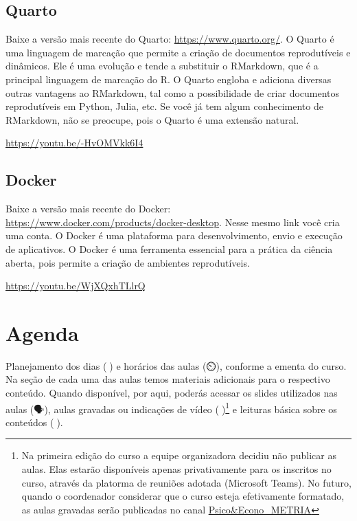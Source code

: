 \documentclass[
  a4paper,
]{article}
\begin{document}
\subsection*{Quarto}\label{sec-quartoprework}


Baixe a versão mais recente do Quarto: \url{https://www.quarto.org/}. O
Quarto é uma linguagem de marcação que permite a criação de documentos
reprodutíveis e dinâmicos. Ele é uma evolução e tende a substituir o
RMarkdown, que é a principal linguagem de marcação do R. O Quarto
engloba e adiciona diversas outras vantagens ao RMarkdown, tal como a
possibilidade de criar documentos reprodutíveis em Python, Julia, etc.
Se você já tem algum conhecimento de RMarkdown, não se preocupe, pois o
Quarto é uma extensão natural.

\url{https://youtu.be/-HvOMVkk6I4}

\subsection*{Docker}\label{sec-dockerprework}


Baixe a versão mais recente do Docker:
\url{https://www.docker.com/products/docker-desktop}. Nesse mesmo link
você cria uma conta. O Docker é uma plataforma para desenvolvimento,
envio e execução de aplicativos. O Docker é uma ferramenta essencial
para a prática da ciência aberta, pois permite a criação de ambientes
reprodutíveis.

\url{https://youtu.be/WjXQxhTLlrQ}


\section*{Agenda 📅}\label{sec-schedule}


Planejamento dos dias (📅) e horários das aulas (⏲️), conforme a ementa
do curso. Na seção de cada uma das aulas temos materiais adicionais para
o respectivo conteúdo. Quando disponível, por aqui, poderás acessar os
slides utilizados nas aulas (🗣️), aulas gravadas ou indicações de vídeo
(🎥)\footnote{Na primeira edição do curso a equipe organizadora decidiu
  não publicar as aulas. Elas estarão disponíveis apenas privativamente
  para os inscritos no curso, através da platorma de reuniões adotada
  (Microsoft Teams). No futuro, quando o coordenador considerar que o
  curso esteja efetivamente formatado, as aulas gravadas serão
  publicadas no canal
  \href{https://www.youtube.com/c/PsicoEconoMETRIA}{Psico\&Econo\_METRIA}}
e leituras básica sobre os conteúdos (📓).
\end{document}
